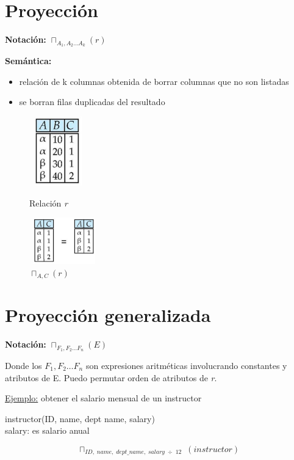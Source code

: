 \documentclass[12pt,a4paper]{report}
\begin{document}
	\pagebreak
	\section{Proyección}
		\par \textbf{Notación:} $\sqcap_{A_{1}, A_{2} \dotsc A_{k}}(r)$
		\vspace{3mm}
		\par \textbf{Semántica:}
		\begin{itemize}
			\item relación de k columnas obtenida de borrar columnas que no son listadas
			\item se borran filas duplicadas del resultado
		\end{itemize}
		
		\begin{figure}[htb]
				\centering
				\includegraphics[width=2.5cm, height=3cm]{./imagenes/proyeccion1.png}
				\caption{Relación \textit{r}}
				\vspace{5mm}
				\includegraphics[width=3cm, height=2cm]{./imagenes/proyeccion2.png}
				\caption{$\sqcap_{A, C}(r)$}
		\end{figure}
	
	\section{Proyección generalizada}
		\par \textbf{Notación:} $\sqcap_{F_{1}, F_{2} \dotsc F_{n}}(E)$
		\vspace{5mm}
		\par Donde los $F_{1}, F_{2} \dotsc F_{n}$ son expresiones aritméticas involucrando constantes y atributos de E. Puedo permutar orden de atributos de \textit{r}.
		
		\vspace{5mm}
		\par \underline{Ejemplo:} obtener el salario mensual de un instructor
		\begin{center} instructor(ID, name, dept name, salary) \\ salary: es salario anual \end{center}
		\[\sqcap_{ID, \; name, \; dept\_name, \; salary \; \div \; 12} \; (instructor)\]
	
\end{document}

